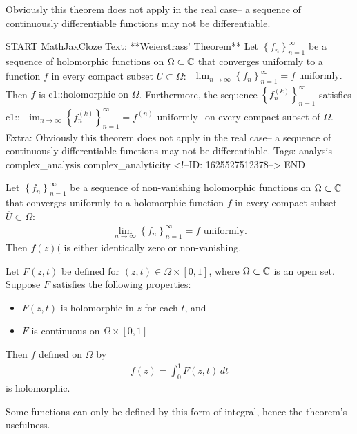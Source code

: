 \documentclass{memoir}
\begin{document}
Obviously this theorem does not apply in the real case-- a sequence of continuously differentiable functions may not be differentiable.\\

\begin{anki}
START
MathJaxCloze
Text: **Weierstrass' Theorem**
Let \(\left\{ f_n \right\}_{n=1}^{\infty}\) be a sequence of holomorphic functions on \(\Omega \subset \mathbb{C}\) that converges uniformly to a function \(f\) in every compact subset \(\overline{U}\subset \Omega \):
\(\begin{align*}
  	\lim_{n \to \infty} \left\{ f_n \right\}_{n=1}^{\infty} = f \text{ uniformly}.
  \end{align*}\)
Then \(f\) is {{c1::holomorphic on \(\Omega \)}}. Furthermore, the sequence \(\left\{ f^{(k)}_n \right\}_{n=1}^{\infty}\) satisfies
 {{c1::\(\begin{align*}
        	\lim_{n \to \infty} \left\{ f^{(k)}_n\right\}_{n=1}^{\infty} = f^{(n)} \text{ uniformly} 
        \end{align*}\)}}
on every compact subset of \(\Omega \).
Extra: Obviously this theorem does not apply in the real case-- a sequence of continuously differentiable functions may not be differentiable.
Tags: analysis complex_analysis complex_analyticity
<!--ID: 1625527512378-->
END
\end{anki}

\begin{cor}
	Let \(\left\{ f_n \right\}_{n=1}^{\infty}\) be a sequence of non-vanishing holomorphic functions on \(\Omega \subset \mathbb{C}\) that converges uniformly to a holomorphic function \(f\) in every compact subset \(\overline{U}\subset \Omega \):
	\begin{align*}
		\lim_{n \to \infty} \left\{ f_n \right\}_{n=1}^{\infty} = f \text{ uniformly}.
	\end{align*}
	Then \(f(z)(\) is either identically zero or non-vanishing.
\end{cor}

\begin{thm}
	Let \(F(z,t)\) be defined for \((z,t) \in \Omega  \times [0,1]\), where \(\Omega \subset \mathbb{C}\) is an open set. Suppose \(F\) satisfies the following properties:
	\begin{itemize}
		\item \(F(z,t)\) is holomorphic in \(z\) for each \(t\), and
		\item \(F\) is continuous on \(\Omega  \times [0,1]\)
	\end{itemize}
	Then \(f\) defined on \(\Omega \) by
	\begin{align*}
		f(z) = \int_{0}^{1} F(z,t)\,d t 
	\end{align*}
	is holomorphic.
\end{thm}
Some functions can only be defined by this form of integral, hence the theorem's usefulness.
\end{document}
